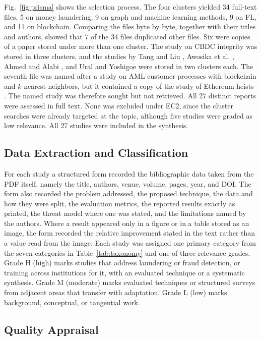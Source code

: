 \documentclass[journal]{IEEEtran}
\begin{document}
Fig.~\ref{fig:prisma} shows the selection process. The four clusters yielded 34 full-text files, 5 on money laundering, 9 on graph and machine learning methods, 9 on FL, and 11 on blockchain. Comparing the files byte by byte, together with their titles and authors, showed that 7 of the 34 files duplicated other files. Six were copies of a paper stored under more than one cluster. The study on CBDC integrity \cite{amber2026cbdc} was stored in three clusters, and the studies by Tang and Liu \cite{tang2024sdt}, Awosika et al. \cite{awosika2024xai}, Ahmed and Alabi \cite{ahmed2024bcfl}, and Ural and Yoshigoe \cite{ural2023bcml} were stored in two clusters each. The seventh file was named after a study on AML customer processes with blockchain and $k$ nearest neighbors, but it contained a copy of the study of Ethereum heists \cite{wu2024heists}. The named study was therefore sought but not retrieved. All 27 distinct reports were assessed in full text. None was excluded under EC2, since the cluster searches were already targeted at the topic, although five studies were graded as low relevance. All 27 studies were included in the synthesis.

\subsection{Data Extraction and Classification}

For each study a structured form recorded the bibliographic data taken from the PDF itself, namely the title, authors, venue, volume, pages, year, and DOI. The form also recorded the problem addressed, the proposed technique, the data and how they were split, the evaluation metrics, the reported results exactly as printed, the threat model where one was stated, and the limitations named by the authors. Where a result appeared only in a figure or in a table stored as an image, the form recorded the relative improvement stated in the text rather than a value read from the image. Each study was assigned one primary category from the seven categories in Table~\ref{tab:taxonomy} and one of three relevance grades. Grade H (high) marks studies that address laundering or fraud detection, or training across institutions for it, with an evaluated technique or a systematic synthesis. Grade M (moderate) marks evaluated techniques or structured surveys from adjacent areas that transfer with adaptation. Grade L (low) marks background, conceptual, or tangential work.

\subsection{Quality Appraisal}
\end{document}
